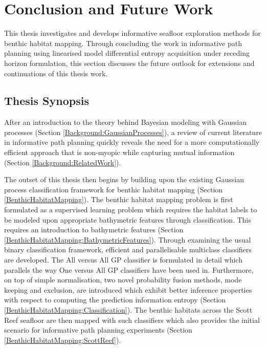 \chapter{Conclusion and Future Work}
\label{Conclusion}

	This thesis investigates and develops informative seafloor exploration methods for benthic habitat mapping. Through concluding the work in informative path planning using linearised model differential entropy acquisition under receding horizon formulation, this section discusses the future outlook for extensions and continuations of this thesis work.
	
	\section{Thesis Synopsis}
	
		After an introduction to the theory behind Bayesian modeling with Gaussian processes (Section \ref{Background:GaussianProcesses}), a review of current literature in informative path planning quickly reveals the need for a more computationally efficient approach that is non-myopic while capturing mutual information (Section \ref{Background:RelatedWork}).
		
		The outset of this thesis then begins by building upon the existing Gaussian process classification framework for benthic habitat mapping (Section \ref{BenthicHabitatMapping}). The benthic habitat mapping problem is first formulated as a supervised learning problem which requires the habitat labels to be modeled upon appropriate bathymetric features through classification. This requires an introduction to bathymetric features (Section \ref{BenthicHabitatMapping:BathymetricFeatures}). Through examining the usual binary classification framework, efficient and parallelisable multiclass classifiers are developed. The All versus All GP classifier is formulated in detail which parallels the way One versus All GP classifiers have been used in. Furthermore, on top of simple normalisation, two novel probability fusion methods, mode keeping and exclusion, are introduced which exhibit better inference properties with respect to computing the prediction information entropy (Section \ref{BenthicHabitatMapping:Classification}). The benthic habitats across the Scott Reef seafloor are then mapped with such classifiers which also provides the initial scenario for informative path planning experiments (Section \ref{BenthicHabitatMapping:ScottReef}).
		
